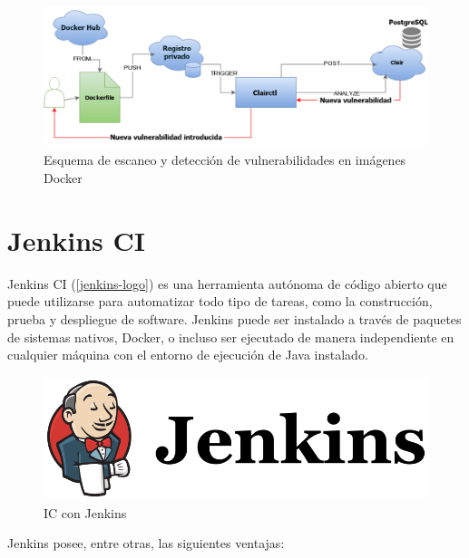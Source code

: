 \begin{figure}[htbp]
	\centering
	\includegraphics[width=1.0\linewidth]
	{entorno/figuras/esquema-clair.png}
	\caption{Esquema de escaneo y detección de vulnerabilidades en imágenes Docker}
	\label{clair-esquema}
\end{figure}

\section{Jenkins \gls{CI}}

Jenkins \gls{CI} (\autoref{jenkins-logo}) es una herramienta autónoma de código abierto que puede utilizarse para automatizar todo tipo de tareas, como la construcción, prueba y despliegue de software. Jenkins puede ser instalado a través de paquetes de sistemas nativos, Docker, o incluso ser ejecutado de manera independiente en cualquier máquina con el entorno de ejecución de Java instalado\cite{jenkins2017}.


\begin{figure}[htbp]
	\centering
	\includegraphics[width=0.80\linewidth]
	{entorno/figuras/jenkins.png}
	\caption{\gls{IC} con Jenkins}
	\label{jenkins-logo}
\end{figure}

Jenkins posee, entre otras, las siguientes ventajas:

